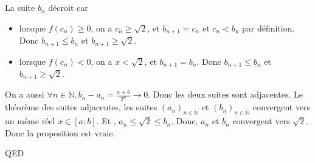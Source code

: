 \documentclass[]{book}
\theoremstyle{definition}
\newcommand{\bb}[1]{\mathbb{#1}}
\newcommand{\N}{\bb{N}}
\begin{document}
La suite $b_n$ d\'ecroit car 
\begin{itemize}
\item lorsque $f(c_n) \ge 0$, on a $c_n \ge \sqrt{2}$, et $b_{n+1} = c_n$ et $c_n < b_n$ par d\'efinition. Donc $b_{n+1} \le b_{n}$ et $b_{n+1} \ge \sqrt{2}$.
\item lorsque $f(c_n) < 0$, on a $x < \sqrt{2}$, et $b_{n+1} = b_n$. Donc $b_{n+1} \le b_{n}$ et $b_{n+1} \ge \sqrt{2}$.   
\end{itemize}

On a aussi $\forall n \in \N, b_n - a_n = \frac{a+b}{2^n} \to 0$. Donc les deux suites sont adjacentes. Le th\'eor\`eme des suites adjacentes, les suites $(a_n)_{n \in \N}$ et $(b_n)_{n \in \N}$ convergent vers un
m\^eme r\'eel $x \in[a; b]$. Et , $a_n \le \sqrt{2} \le b_n$. Donc, $a_n$ et $b_n$ convergent vers $\sqrt{2}$.\\


Donc la proposition est vraie.


QED
\end{document}

